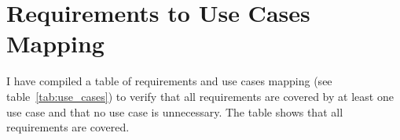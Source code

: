 


\section{Requirements to Use Cases Mapping}
I have compiled a table of requirements and use cases mapping (see table~\ref{tab:use_cases}) to verify that all requirements are covered by at least one use case and that no use case is unnecessary.
The table shows that all requirements are covered.

